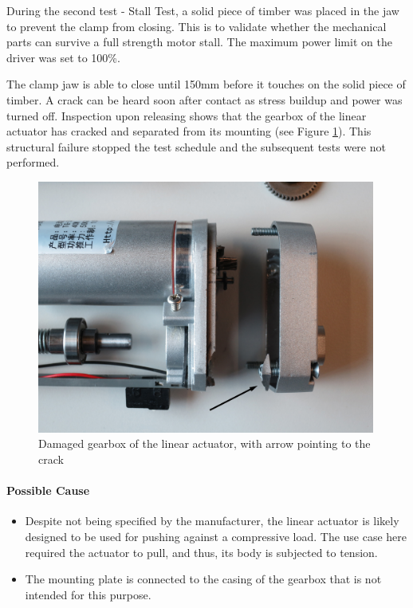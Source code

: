 During the second test - Stall Test, a solid piece of timber was placed in the jaw to prevent the clamp from closing. This is to validate whether the mechanical parts can survive a full strength motor stall. The maximum power limit on the driver was set to 100\%.

The clamp jaw is able to close until 150mm before it touches on the solid piece of timber. A crack can be heard soon after contact as stress buildup and power was turned off. Inspection upon releasing shows that the gearbox of the linear actuator has cracked and separated from its mounting (see Figure \ref{fig:cl1-damaged-gearbox-photo}). This structural failure stopped the test schedule and the subsequent tests were not performed.

\begin{figure}[h]
    \centering
    \includegraphics[width=0.99\textwidth]{images/04-4+5/cl1-damaged-gearbox-witharrow.jpg}
    \caption{Damaged gearbox of the linear actuator, with arrow pointing to the crack}
    \label{fig:cl1-damaged-gearbox-photo}
\end{figure}

\paragraph{Possible Cause}

\begin{itemize}[nosep]
    \item Despite not being specified by the manufacturer, the linear actuator is likely designed to be used for pushing against a compressive load. The use case here required the actuator to pull, and thus, its body is subjected to tension.
    \item The mounting plate is connected to the casing of the gearbox that is not intended for this purpose.
\end{itemize}

